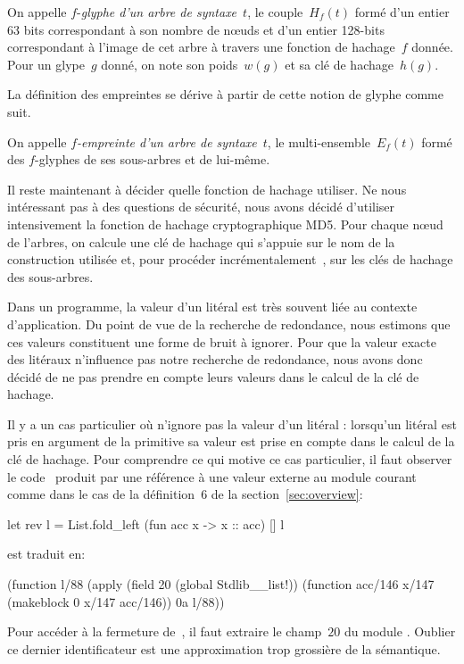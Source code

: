 \begin{defn}
On appelle $f$-\textit{glyphe d'un arbre de syntaxe}~$t$, le
couple~$H_f(t)$ formé d'un entier 63 bits correspondant à son nombre
de n{\oe}uds et d'un entier 128-bits correspondant à l'image de cet
arbre à travers une fonction de hachage~$f$ donnée. Pour un glype~$g$
donné, on note son poids~$w(g)$ et sa clé de hachage~$h(g)$.
\end{defn}

La définition des empreintes se dérive à partir de cette notion de glyphe
comme suit.

\begin{defn}
On appelle \textit{$f$-empreinte d'un arbre de syntaxe}~$t$, le
multi-ensemble~$E_f(t)$ formé des $f$-glyphes de ses sous-arbres
et de lui-même.
\end{defn}

Il reste maintenant à décider quelle fonction de hachage utiliser. Ne
nous intéressant pas à des questions de sécurité, nous avons décidé
d'utiliser intensivement la fonction de hachage cryptographique
MD5. Pour chaque n{\oe}ud de l'arbres, on calcule une clé de hachage
qui s'appuie sur le nom de la construction utilisée et, pour procéder
incrémentalement~\cite{DBLP:conf/ml/FilliatreC06}, sur les clés de
hachage des sous-arbres.

Dans un programme, la valeur d'un litéral est très souvent liée au
contexte d'application. Du point de vue de la recherche de redondance, nous
estimons que ces valeurs constituent une forme de bruit à ignorer.
Pour que la valeur exacte des litéraux n'influence pas notre recherche
de redondance, nous avons donc décidé de ne pas prendre en compte leurs
valeurs dans le calcul de la clé de hachage.

Il y a un cas particulier où {\Asak} n'ignore pas la valeur d'un
litéral : lorsqu'un litéral est pris en argument de la primitive
 sa valeur est prise en compte dans le calcul de la
clé de hachage. Pour comprendre ce qui motive ce cas particulier, il
faut observer le code~{\LambdaCode} produit par une référence à une
valeur externe au module courant comme dans le cas de la définition~$6$
de la section~\ref{sec:overview}:

\begin{ocaml}
let rev l =
  List.fold_left (fun acc x -> x :: acc) [] l
\end{ocaml}

\noindent est traduit en:

\begin{ocaml}
(function l/88 (apply (field 20 (global Stdlib__list!))
    (function acc/146 x/147 (makeblock 0 x/147 acc/146)) 0a l/88))
\end{ocaml}

Pour accéder à la fermeture de~, il faut
extraire le champ~$20$ du module . Oublier ce
dernier identificateur est une approximation trop grossière de
la sémantique.
